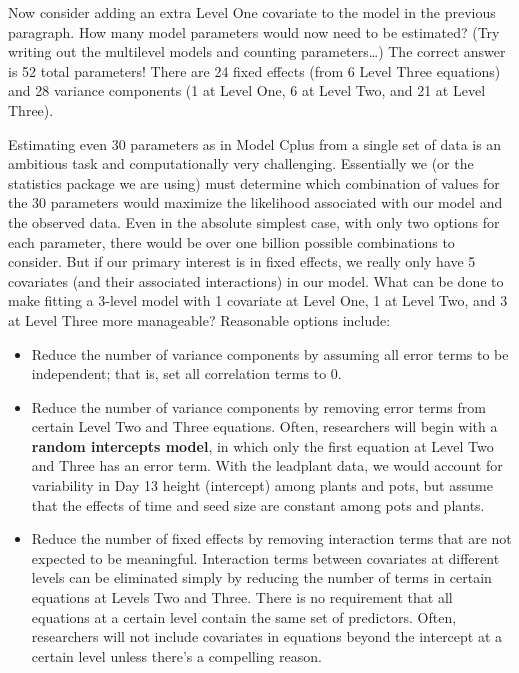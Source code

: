 \documentclass[
]{krantz}
\providecommand{\tightlist}{%
  \setlength{\itemsep}{0pt}\setlength{\parskip}{0pt}}
\begin{document}
Now consider adding an extra Level One covariate to the model in the previous paragraph. How many model parameters would now need to be estimated? (Try writing out the multilevel models and counting parameters\ldots) The correct answer is 52 total parameters! There are 24 fixed effects (from 6 Level Three equations) and 28 variance components (1 at Level One, 6 at Level Two, and 21 at Level Three).

Estimating even 30 parameters as in Model Cplus from a single set of data is an ambitious task and computationally very challenging. Essentially we (or the statistics package we are using) must determine which combination of values for the 30 parameters would maximize the likelihood associated with our model and the observed data. Even in the absolute simplest case, with only two options for each parameter, there would be over one billion possible combinations to consider. But if our primary interest is in fixed effects, we really only have 5 covariates (and their associated interactions) in our model. What can be done to make fitting a 3-level model with 1 covariate at Level One, 1 at Level Two, and 3 at Level Three more manageable? Reasonable options include:

\begin{itemize}
\tightlist
\item
  Reduce the number of variance components by assuming all error terms to be independent; that is, set all correlation terms to 0.
\item
  Reduce the number of variance components by removing error terms from certain Level Two and Three equations. Often, researchers will begin with a \textbf{random intercepts model}, in which only the first equation at Level Two and Three has an error term. With the leadplant data, we would account for variability in Day 13 height (intercept) among plants and pots, but assume that the effects of time and seed size are constant among pots and plants.
\item
  Reduce the number of fixed effects by removing interaction terms that are not expected to be meaningful. Interaction terms between covariates at different levels can be eliminated simply by reducing the number of terms in certain equations at Levels Two and Three. There is no requirement that all equations at a certain level contain the same set of predictors. Often, researchers will not include covariates in equations beyond the intercept at a certain level unless there's a compelling reason.
\end{itemize}
\end{document}
